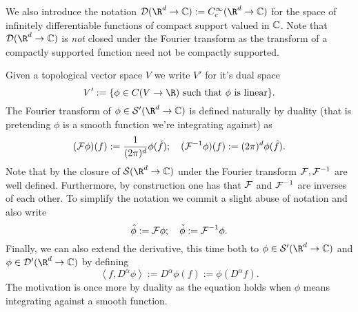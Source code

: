\documentclass[12pt]{article}
\newcommand{\br}[1]{\left\langle#1\right\rangle}
\begin{document}
\begin{CJK*}{UTF8}{gbsn}
	We also introduce the notation $\mathcal{D}(\R^d\to\C):=C_c^\infty(\R^d\to\C)$ for the space of infinitely differentiable functions of compact support valued in $\mathbb{C}$. Note that $\mathcal{D}(\R^d\to\C)$ is \emph{not} closed under the Fourier transform as the transform of a compactly supported function need not be compactly supported.

	Given a topological vector space $V$ we write  $V'$ for it's dual space
	\begin{equation*}
		V':=\{\phi\in C(V\to\R) \text{ such that } \phi \text{ is linear}   \}.
	\end{equation*}
	The Fourier transform of $\phi \in \Ss'(\R^d\to\C)$ is defined naturally by duality (that is pretending $\phi$ is a smooth function we're integrating against) as
	\begin{equation*}
		(\mathcal{F}\phi)(f):=\frac{1}{(2\pi)^d} \phi(\check{f});\quad (\mathcal{F}^{-1}\phi)(f):=(2\pi )^d\phi(\hat{f}) .
	\end{equation*}
	Note that by the closure of $\Ss(\R^d\to \C)$ under the Fourier transform $\mathcal{F},\mathcal{F}^{-1}$ are well defined. Furthermore, by construction one has that $\mathcal{F}$ and $\mathcal{F}^{-1}$ are inverses of each other. To simplify the notation we commit a slight abuse of notation and also write $$\hat{\phi}:=\mathcal{F}\phi;\quad  \check{\phi}:= \mathcal{F}^{-1}\phi.$$
	Finally, we can also extend the derivative, this time both to $\phi\in\mathcal{S}'(\R^d\to\mathbb{C})$ and $\phi\in\mathcal{D}'(\R^d\to\mathbb{C})$ by defining
	\begin{equation*}
		\br{f,D^\alpha\phi}:=D^\alpha \phi(f):=\phi(D^\alpha f).
	\end{equation*}
	The motivation is once more by duality as the equation holds when $\phi$ means integrating against a smooth function.

\end{CJK*}
\end{document}
